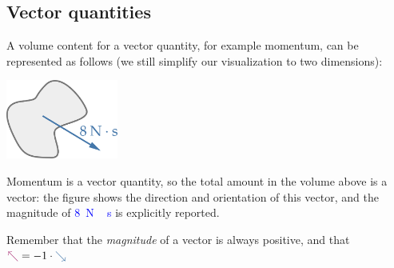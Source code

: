 \documentclass[a4paper,12pt,%
onecolumn,oneside,%
british%
]{memoir}
\renewcommand*{\|}[1][]{\nonscript\:#1\vert\nonscript\:\mathopen{}}
\begin{document}
\subsection{Vector quantities}\label{sec:volintegral_vector}

A volume content for a vector quantity, for example momentum, can be represented as follows (we still simplify our visualization to two dimensions):
\begin{center}
  \includegraphics[height=7em]{images/volumeintegral_8Ns.pdf}
\end{center}
Momentum is a vector quantity, so the total amount in the volume above is a vector: the figure shows the direction and orientation of this vector, and the magnitude of \textcolor{blue}{\qty{8}{N\,s}}
is explicitly reported.
\begin{warning}
  Remember that the \emph{magnitude} of a vector is always positive, and that\quad $\mathord{\mathcolor{purple}{\nwarrow}} = -1\cdot\mathord{\mathcolor{blue}{\searrow}}$
\end{warning}
\end{document}

